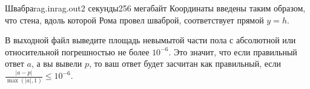 \begin{problem}{Швабра}{rag.in}{rag.out}{2 секунды}{256 мегабайт}
Координаты введены таким образом, что стена, вдоль которой Рома провел
шваброй, соответствует прямой $y=h$.
 
\OutputFile
В выходной файл выведите площадь невымытой части пола
с абсолютной или относительной погрешностью не более $10^{-6}$.
Это значит, что если правильный ответ $a$, а вы вывели $p$, то
ваш ответ будет засчитан как правильный, если $\frac{|a-p|}{\max(|a|, 1)} \le 10^{-6}$.

\Examples

\begin{example}%
%
\end{example}

\end{problem}
